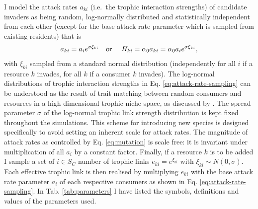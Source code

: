 \documentclass[a4paper]{report}
\begin{document}
I model the attack rates $a_{ki}$ (i.e.\ the trophic interaction
strengths) of candidate invaders as being random, log-normally
distributed and statistically independent from each other (except
for the base attack rate parameter which is sampled from existing residents) that is
\begin{align}
  a_{ki}=a_{i}e^{\sigma \xi_{ki}}\text{\quad or \quad} H_{ki}=\alpha_0a_{ki}=\alpha_0 a_{i}e^{\sigma
    \xi_{ki}},
  \label{eq:attack-rate-sampling}
\end{align}
with $\xi_{ki}$ sampled from a standard normal distribution
(independently for all $i$ if a resource $k$ invades, for all $k$ if a
consumer $k$ invades). The log-normal distributions of trophic
interaction strengths in Eq. \eqref{eq:attack-rate-sampling} can be
understood as the result of trait matching between random consumers
and resources in a high-dimensional trophic niche space,
as discussed by \citep{Rossberg2013}. The spread parameter $\sigma$ of the log-normal
trophic link strength distribution is kept
fixed throughout the simulations. This scheme for introducing new species is designed specifically to avoid setting an inherent scale for attack rates. The magnitude of
attack rates as controlled by Eq. \eqref{eq:mutation} is scale free: it is invariant under multiplication of all
$a_i$ by a constant factor. Finally, if a resource $k$ is to be added I sample a set of $i \in S_C$ number of trophic links $e_{ki}=e^{\xi_{ki}}$ with $\xi_{ki} \sim N(0,\sigma)$. Each effective trophic link is then realised by multiplying $e_{ki}$ with the base attack rate parameter $a_i$ of each respective consumers as shown in Eq. \eqref{eq:attack-rate-sampling}. In Tab. \ref{tab:parameters} I have listed the symbols, definitions and values of the parameters used. 
\end{document}
